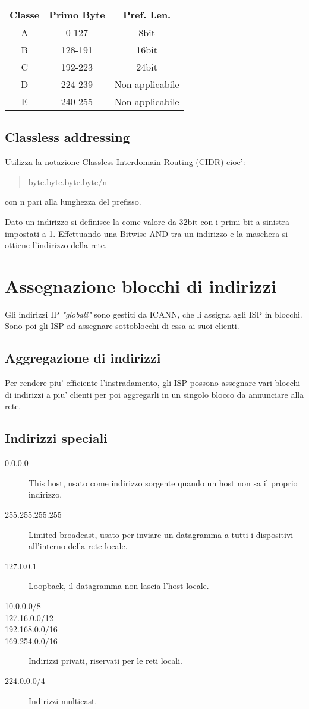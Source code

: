 \begin{tabular}{||c c c||}
    \hline
    Classe & Primo Byte & Pref. Len.\\
    \hline\hline
    A & 0-127 & 8bit\\
    B & 128-191 & 16bit\\
    C & 192-223 & 24bit\\
    D & 224-239 & Non applicabile\\
    E & 240-255 & Non applicabile\\
    \hline
\end{tabular}
\subsection{Classless addressing}
Utilizza la notazione Classless Interdomain Routing (CIDR) cioe':
\begin{quote}
    byte.byte.byte.byte/n
\end{quote}
con n pari alla lunghezza del prefisso.

Dato un indirizzo  si definisce la  come valore da 32bit con i primi  bit a sinistra impostati a 1.
Effettuando una Bitwise-AND tra un indirizzo e la maschera si ottiene l'indirizzo della rete.

\section{Assegnazione blocchi di indirizzi}
Gli indirizzi IP \textit{"globali"} sono gestiti da ICANN, che li assigna agli ISP in blocchi. Sono poi gli ISP ad assegnare sottoblocchi di essa ai suoi clienti.
\subsection{Aggregazione di indirizzi}
Per rendere piu' efficiente l'instradamento, gli ISP possono assegnare vari blocchi di indirizzi a piu' clienti per poi aggregarli in un singolo blocco da annunciare alla rete.
\subsection{Indirizzi speciali}
\begin{description}
    \item[0.0.0.0] This host, usato come indirizzo sorgente quando un host non sa il proprio indirizzo.
    \item[255.255.255.255] Limited-broadcast, usato per inviare un datagramma a tutti i dispositivi all'interno della rete locale.
    \item[127.0.0.1] Loopback, il datagramma non lascia l'host locale.
    \item[10.0.0.0/8] 
    \item[127.16.0.0/12] 
    \item[192.168.0.0/16]
    \item[169.254.0.0/16] Indirizzi privati, riservati per le reti locali.
    \item[224.0.0.0/4] Indirizzi multicast.
\end{description}

